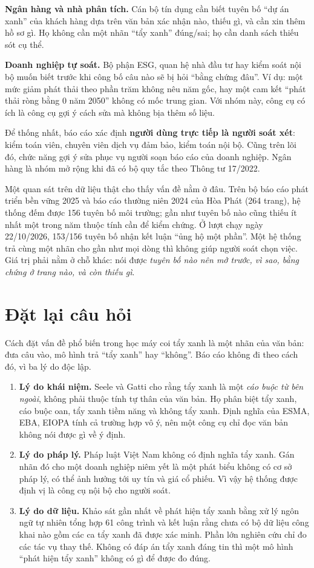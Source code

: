 \textbf{Ngân hàng và nhà phân tích.} Cán bộ tín dụng cần biết tuyên bố “dự án xanh” của khách hàng dựa trên văn bản xác nhận nào, thiếu gì, và cần xin thêm hồ sơ gì. Họ không cần một nhãn “tẩy xanh” đúng/sai; họ cần danh sách thiếu sót cụ thể.

\textbf{Doanh nghiệp tự soát.} Bộ phận ESG, quan hệ nhà đầu tư hay kiểm soát nội bộ muốn biết trước khi công bố câu nào sẽ bị hỏi “bằng chứng đâu”. Ví dụ: một mức giảm phát thải theo phần trăm không nêu năm gốc, hay một cam kết “phát thải ròng bằng 0 năm 2050” không có mốc trung gian. Với nhóm này, công cụ có ích là công cụ gợi ý cách sửa mà không bịa thêm số liệu.

Để thống nhất, báo cáo xác định \textbf{người dùng trực tiếp là người soát xét}: kiểm toán viên, chuyên viên dịch vụ đảm bảo, kiểm toán nội bộ. Cũng trên lõi đó, chức năng gợi ý sửa phục vụ người soạn báo cáo của doanh nghiệp. Ngân hàng là nhóm mở rộng khi đã có bộ quy tắc theo Thông tư 17/2022.

Một quan sát trên dữ liệu thật cho thấy vấn đề nằm ở đâu. Trên bộ báo cáo phát triển bền vững 2025 và báo cáo thường niên 2024 của Hòa Phát (264 trang), hệ thống đếm được 156 tuyên bố môi trường; gần như tuyên bố nào cũng thiếu ít nhất một trong năm thuộc tính cần để kiểm chứng. Ở lượt chạy ngày 22/10/2026, 153/156 tuyên bố nhận kết luận “ủng hộ một phần”. Một hệ thống trả cùng một nhãn cho gần như mọi dòng thì không giúp người soát chọn việc. Giá trị phải nằm ở chỗ khác: nói được \emph{tuyên bố nào nên mở trước, vì sao, bằng chứng ở trang nào, và còn thiếu gì}.

\section{Đặt lại câu hỏi}

Cách đặt vấn đề phổ biến trong học máy coi tẩy xanh là một nhãn của văn bản: đưa câu vào, mô hình trả “tẩy xanh” hay “không”. Báo cáo không đi theo cách đó, vì ba lý do độc lập.

\begin{enumerate}
\item \textbf{Lý do khái niệm.} Seele và Gatti \cite{seele2017} cho rằng tẩy xanh là một \emph{cáo buộc từ bên ngoài}, không phải thuộc tính tự thân của văn bản. Họ phân biệt tẩy xanh, cáo buộc oan, tẩy xanh tiềm năng và không tẩy xanh. Định nghĩa của ESMA, EBA, EIOPA tính cả trường hợp vô ý, nên một công cụ chỉ đọc văn bản không nói được gì về ý định.
\item \textbf{Lý do pháp lý.} Pháp luật Việt Nam không có định nghĩa tẩy xanh. Gán nhãn đó cho một doanh nghiệp niêm yết là một phát biểu không có cơ sở pháp lý, có thể ảnh hưởng tới uy tín và giá cổ phiếu. Vì vậy hệ thống được định vị là công cụ nội bộ cho người soát.
\item \textbf{Lý do dữ liệu.} Khảo sát gần nhất về phát hiện tẩy xanh bằng xử lý ngôn ngữ tự nhiên \cite{calamai2025} tổng hợp 61 công trình và kết luận rằng chưa có bộ dữ liệu công khai nào gồm các ca tẩy xanh đã được xác minh. Phần lớn nghiên cứu chỉ đo các tác vụ thay thế. Không có đáp án tẩy xanh đáng tin thì một mô hình “phát hiện tẩy xanh” không có gì để được đo đúng.
\end{enumerate}

